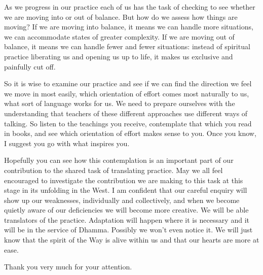 As we progress in our practice each of us has the task of checking to
see whether we are moving into or out of balance. But how do we assess
how things are moving? If we are moving into balance, it means we can
handle more situations, we can accommodate states of greater complexity.
If we are moving out of balance, it means we can handle fewer and fewer
situations: instead of spiritual practice liberating us and opening us
up to life, it makes us exclusive and painfully cut off.

So it is wise to examine our practice and see if we can find the
direction we feel we move in most easily, which orientation of effort
comes most naturally to us, what sort of language works for us. We need
to prepare ourselves with the understanding that teachers of these
different approaches use different ways of talking. So listen to the
teachings you receive, contemplate that which you read in books, and see
which orientation of effort makes sense to you. Once you know, I suggest
you go with what inspires you.

Hopefully you can see how this contemplation is an important part of our
contribution to the shared task of translating practice. May we all feel
encouraged to investigate the contribution we are making to this task at
this stage in its unfolding in the West. I am confident that our careful
enquiry will show up our weaknesses, individually and collectively, and
when we become quietly aware of our deficiencies we will become more
creative. We will be able translators of the practice. Adaptation will
happen where it is necessary and it will be in the service of Dhamma.
Possibly we won't even notice it. We will just know that the spirit of
the Way is alive within us and that our hearts are more at ease.

Thank you very much for your attention.

